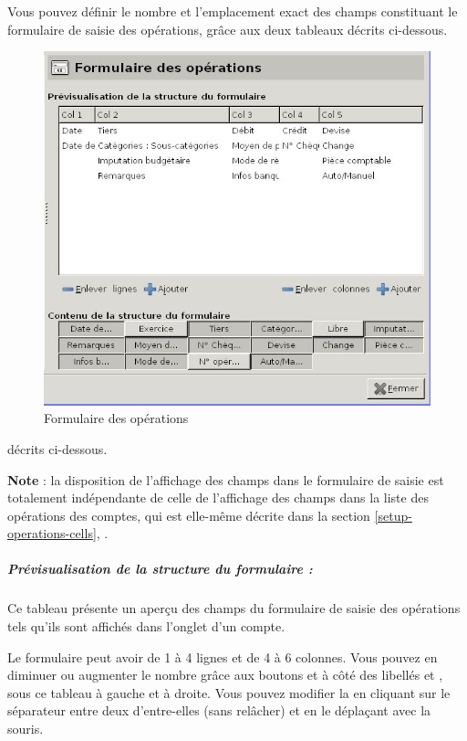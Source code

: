 Vous pouvez définir le nombre et l'emplacement exact des champs constituant le formulaire de saisie des opérations, grâce aux deux tableaux \ifIllustration décrits ci-dessous.
\begin{figure}[htbp]
\begin{center}
\includegraphics[scale=0.5]{image/screenshot/setup_transactions_form}
\end{center}
\caption{Formulaire des opérations}
\label{setup-transactions-form-img}
\end{figure}
\else décrits ci-dessous.
\fi

\textbf{Note} : la disposition de l'affichage des champs dans le formulaire de saisie est totalement indépendante de celle de  l'affichage des champs dans la liste des opérations des comptes, qui est elle-même décrite dans la section \vref{setup-operations-cells}, .


\subparagraph{Prévisualisation de la structure du formulaire :\label{setup-form-content-display}}

Ce tableau présente un aperçu des champs du formulaire de saisie des opérations tels qu'ils sont affichés dans l'onglet  d'un compte.

Le formulaire peut avoir de 1 à 4 lignes et de 4 à 6 colonnes. Vous pouvez en diminuer ou augmenter le nombre grâce aux boutons  et  à côté des libellés  et , sous ce tableau à gauche et à droite. Vous pouvez modifier la  en cliquant sur le séparateur entre deux d'entre-elles (sans relâcher) et en le déplaçant avec la souris.

